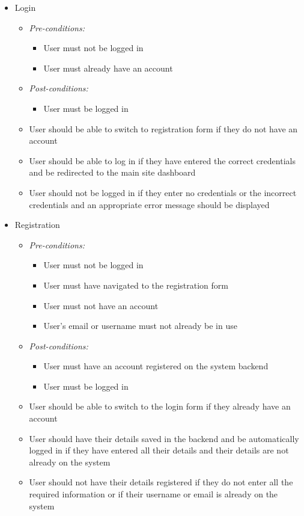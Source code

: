 \documentclass{article}
\begin{document}
				\begin{itemize}
					\item Login
					
					\begin{itemize}
						\item \textit{Pre-conditions:}
						\begin{itemize}
							\item User must not be logged in
							\item User must already have an account
						\end{itemize}
						\item \textit{Post-conditions:}
						\begin{itemize}
							\item User must be logged in
						\end{itemize}						 
						\item User should be able to switch to registration form if they do not have an account
						\item User should be able to log in if they have entered the correct credentials and be redirected to the main site dashboard
						\item User should not be logged in if they enter no credentials or the incorrect credentials and an appropriate error message should be displayed
						
					\end{itemize}
					
					\item Registration
					\begin{itemize}
						\item \textit{Pre-conditions:}
						\begin{itemize}
							\item User must not be logged in
							\item User must have navigated to the registration form
							\item User must not have an account
							\item User's email or username must not already be in use
						\end{itemize}
						\item \textit{Post-conditions:}
						\begin{itemize}
							\item User must have an account registered on the system backend
							\item User must be logged in
						\end{itemize}
						\item User should be able to switch to the login form if they already have an account
						\item User should have their details saved in the backend and be automatically logged in if they have entered all their details and their details are not already on the system
						\item User should not have their details registered if they do not enter all the required information or if their username or email is already on the system
					\end{itemize}				 
				\end{itemize}
\end{document}
